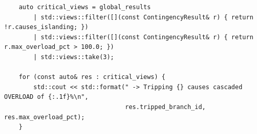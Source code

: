 \begin{verbatim}
    auto critical_views = global_results 
        | std::views::filter([](const ContingencyResult& r) { return !r.causes_islanding; })
        | std::views::filter([](const ContingencyResult& r) { return r.max_overload_pct > 100.0; })
        | std::views::take(3);

    for (const auto& res : critical_views) {
        std::cout << std::format(" -> Tripping {} causes cascaded OVERLOAD of {:.1f}%\n", 
                                 res.tripped_branch_id, res.max_overload_pct);
    }
\end{verbatim}
